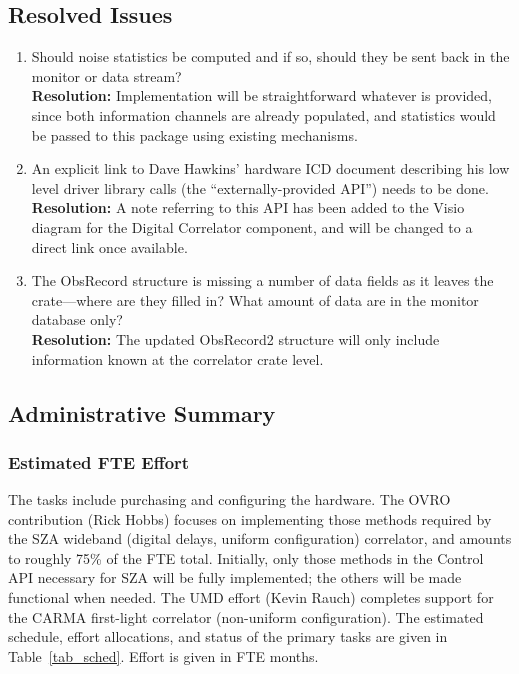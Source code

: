 \documentclass[11pt]{article}
\begin{document}
\subsection{Resolved Issues}
%
%
\begin{enumerate}

\item
Should noise statistics be computed and if so, should they be sent back in
the monitor or data stream?
\\
{\bf Resolution:\/}
Implementation will be straightforward whatever is
provided, since both information channels are already populated, and statistics
would be passed to this package using existing mechanisms.

\item
An explicit link to Dave Hawkins' hardware ICD document describing his low
level driver library calls (the ``externally-provided API'') needs to be done.
\\
{\bf Resolution:\/}
A note referring to this API has been added to the Visio diagram for the
Digital Correlator component, and will be changed to a direct link once
available.

\item
The ObsRecord structure is missing a number of data fields as it leaves the
crate---where are they filled in? What amount of data are in the monitor
database only?
\\
{\bf Resolution:\/}
The updated ObsRecord2 structure will only include
information known at the correlator crate level.

\end{enumerate}
%
%
\subsection{Administrative Summary}
%
%
\subsubsection{Estimated FTE Effort\label{sec_fte}}
%
%
The tasks include purchasing and configuring the hardware. The OVRO
contribution (Rick Hobbs) focuses on implementing those methods required by
the SZA wideband (digital delays, uniform configuration) correlator, and
amounts to roughly 75\% of the FTE total. Initially, only those methods in the
Control API necessary for SZA will be fully implemented; the others will be
made functional when needed. The UMD effort (Kevin Rauch) completes support
for the CARMA first-light correlator (non-uniform configuration).
The estimated schedule, effort allocations, and status of
the primary tasks are given in Table~\ref{tab_sched}. Effort is given in FTE
months.
\end{document}
